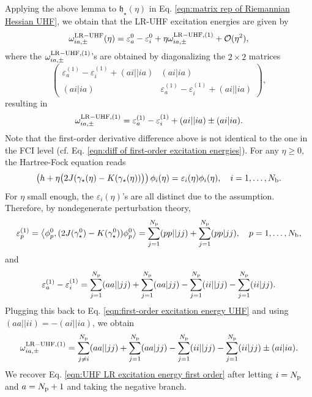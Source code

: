 \documentclass[11pt]{article}
\begin{document}
Applying the above lemma to $\mathfrak h_\star(\eta)$ in Eq. \eqref{eqn:matrix rep of Riemannian Hessian UHF}, we obtain that the LR-UHF excitation energies are given by
$$
\omega_{ia,\pm}^{\rm LR-UHF}(\eta) = \varepsilon_a^0-\varepsilon_i^0 + \eta \omega_{ia,\pm}^{{\rm LR-UHF},(1)} + \mathcal O(\eta^2),
$$
where the $\omega_{ia,\pm}^{{\rm LR-UHF},(1)}$'s are obtained by diagonalizing the $2 \times 2$ matrices
$$
\left(\begin{array}{cc} \varepsilon_a^{(1)}-\varepsilon_i^{(1)} + (ai||ia)  & (ai|ia)\\ (ai|ia) &   \varepsilon_a^{(1)}-\varepsilon_i^{(1)} + (ai||ia) \end{array} \right),
$$
resulting in 
\begin{equation}
    \omega_{ia,\pm}^{\rm LR-UHF,(1)}=\varepsilon_a^{(1)}-\varepsilon_i^{(1)}+(ai||ia)\pm(ai|ia).
    \label{eqn:first-order excitation energy UHF}
\end{equation}
Note that the first-order derivative difference above is not identical to the one in the FCI level (cf. Eq. \eqref{eqn:diff of first-order excitation energies}). For any $\eta\ge0$, the Hartree-Fock equation reads
$$\left(h+\eta\big(2J(\gamma_\star(\eta)-K(\gamma_\star(\eta))\big)\right)\phi_i(\eta)=\varepsilon_i(\eta)\phi_i(\eta),\quad i=1,\ldots,N_{\rm b}.$$
For $\eta$ small enough, the $\varepsilon_i(\eta)$'s are all distinct due to the assumption. Therefore, by nondegenerate perturbation theory, 
$$\varepsilon_p^{(1)}=\left\langle\phi_p^0,(2J(\gamma_\star^0)-K(\gamma_\star^0))\phi_p^0\right\rangle=\sum_{j=1}^{N_{\rm p}}(pp||jj)+\sum_{j=1}^{N_{\rm p}}(pp|jj),\quad p=1,\ldots,N_{\rm b},$$
and
$$\varepsilon_a^{(1)}-\varepsilon_i^{(1)}=\sum_{j=1}^{N_{\rm p}}(aa||jj)+\sum_{j=1}^{N_{\rm p}}(aa|jj)-\sum_{j=1}^{N_{\rm p}}(ii||jj)-\sum_{j=1}^{N_{\rm p}}(ii|jj).$$
Plugging this back to Eq. \eqref{eqn:first-order excitation energy UHF} and using $(aa||ii)=-(ai||ia)$, we obtain
$$\omega_{ia,\pm}^{\rm LR-UHF,(1)}=\sum_{j\neq i}^{N_{\rm p}}(aa||jj)+\sum_{j=1}^{N_{\rm p}}(aa|jj)-\sum_{j=1}^{N_{\rm p}}(ii||jj)-\sum_{j=1}^{N_{\rm p}}(ii|jj)\pm(ai|ia).$$
We recover Eq. \eqref{eqn:UHF LR excitation energy first order} after letting $i=N_{\rm p}$ and $a=N_{\rm p}+1$ and taking the negative branch.
\end{document}
